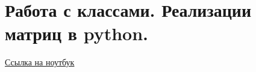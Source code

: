 \section{Работа с классами. Реализации матриц в python.}

\href{https://github.com/andriygav/School/blob/master/2018/AD/Lecture/Lecture12.ipynb}{Ссылка на ноутбук}